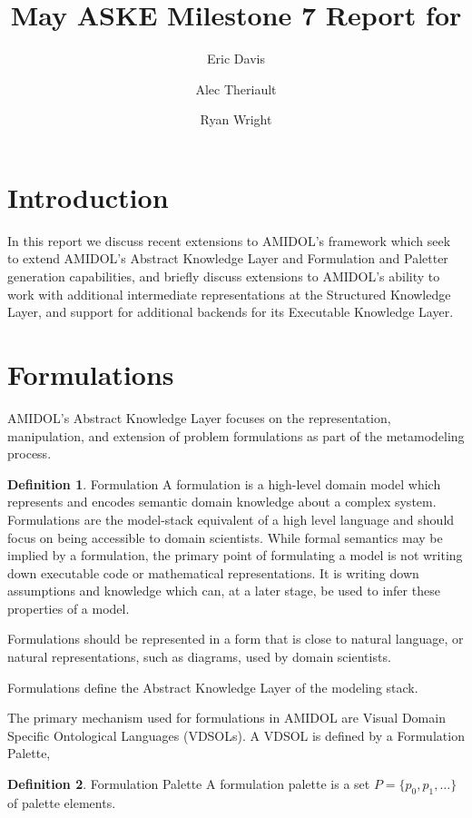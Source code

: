 \documentclass[11pt]{article}
\date{\vspace{-5ex}}
\author[1]{Eric Davis}
\author[1]{Alec Theriault}
\author[1]{Ryan Wright}
\affil[1]{Galois, Inc}
\title{May ASKE Milestone 7 Report for \amidol{}}
\theoremstyle{definition}
\newtheorem{definition}{Definition}[section]
\newcommand{\amidol}{\textsc{AMIDOL}}
\begin{document}
\maketitle
\vspace{10pt}

\section{Introduction}

In this report we discuss recent extensions to \amidol{}'s framework
which seek to extend \amidol{}'s Abstract Knowledge Layer and
Formulation and Paletter generation capabilities, and briefly discuss
extensions to \amidol{}'s ability to work with additional intermediate
representations at the Structured Knowledge Layer, and support for
additional backends for its Executable Knowledge Layer.

\section{Formulations}

\amidol{}'s Abstract Knowledge Layer focuses on the representation,
manipulation, and extension of problem formulations as part of the
metamodeling process.

\begin{definition}{Formulation}
  A formulation is a high-level domain model which represents and
  encodes semantic domain knowledge about a complex system.
  Formulations are the model-stack equivalent of a high level
  language and should focus on being accessible to domain scientists.
  While formal semantics may be implied by a formulation, the primary
  point of formulating a model is not writing down executable code or
  mathematical representations.  It is
  writing down assumptions and knowledge which can, at a later stage,
  be used to infer these properties of a model.

  Formulations should be represented in a form that is close to
  natural language, or natural representations, such as diagrams, used
  by domain scientists.

  Formulations define the Abstract Knowledge Layer of the modeling stack.
\end{definition}

The primary mechanism used for formulations in \amidol{} are Visual
Domain Specific Ontological Languages (VDSOLs).  A VDSOL is defined by
a Formulation Palette,

\begin{definition}{Formulation Palette}
  A formulation palette is a set $P = \{ p_0, p_1, \ldots\}$ of
  palette elements.
\end{definition}
\end{document}
